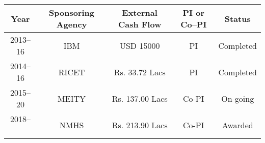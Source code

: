 	\begin{center}{\small
		\begin{tabular}{||c|c|c|c|c||}
			\hline \hline
			Year & Sponsoring Agency & External Cash Flow & PI or Co--PI & Status\\
			\hline \hline
			2013--16 & IBM & USD 15000 & PI & Completed \\ \hline
			2014--16 & RICET & Rs. 33.72 Lacs & PI & Completed \\ \hline
			2015--20 & MEITY & Rs. 137.00 Lacs & Co-PI & On-going \\ \hline
			2018--~~ & NMHS & Rs. 213.90 Lacs & Co-PI & Awarded\\ 
			\hline \hline 
	\end{tabular}}
\end{center}